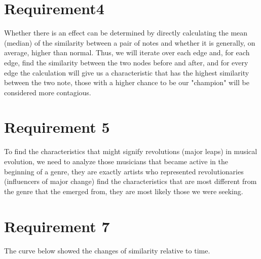 \documentclass[12pt]{article}
\begin{document}
\section{Requirement4}\Large
Whether there is an effect can be determined by directly calculating the mean (median) of the similarity between a pair  of notes and whether it is generally,
on average, higher than normal. Thus, we will iterate over each edge and, for each edge, find the similarity between the two nodes before and after, and for every
edge the calculation will give us a characteristic that has the highest similarity between the two note, those with a higher chance to be our "champion" will be considered
more contagious.
\section{Requirement 5}
To find the characteristics that might signify revolutions (major leaps) in musical evolution, we need to analyze those musicians that became active in the beginning of
a genre, they are exactly artists who represented revolutionaries (influencers of major
change) find the characteristics that are most different from the genre that the emerged from, they are most likely those we were seeking.
\section{Requirement 7}
The curve below showed the changes of similarity relative to time.


\end{document}
